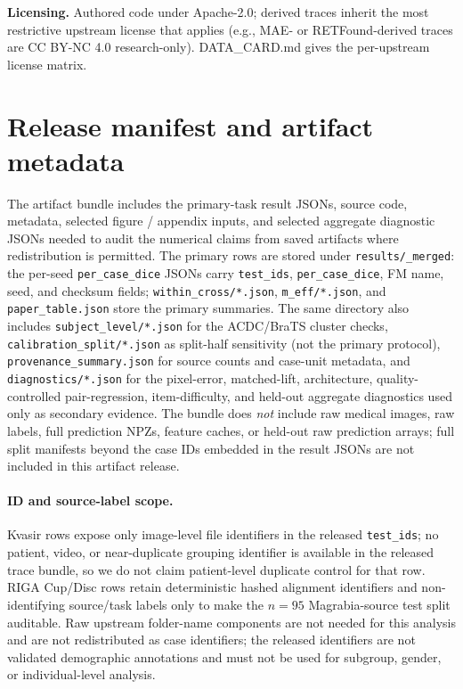 \textbf{Licensing.} Authored code under Apache-2.0; derived traces inherit the most restrictive upstream license that applies (e.g., MAE- or RETFound-derived traces are CC BY-NC 4.0 research-only). DATA\_CARD.md gives the per-upstream license matrix.

\section{Release manifest and artifact metadata}
\label{app:release-manifest}

The artifact bundle includes the primary-task result JSONs,
source code, metadata, selected figure / appendix inputs, and selected
aggregate diagnostic JSONs needed to audit the numerical claims from saved
artifacts where redistribution is permitted. The primary rows are stored under
\texttt{results/\_merged}: the per-seed \texttt{per\_case\_dice} JSONs carry
\texttt{test\_ids}, \texttt{per\_case\_dice}, FM name, seed, and checksum
fields; \texttt{within\_cross/*.json}, \texttt{m\_eff/*.json}, and
\texttt{paper\_table.json} store the primary summaries. The same
directory also includes \texttt{subject\_level/*.json} for the ACDC/BraTS
cluster checks, \texttt{calibration\_split/*.json} as split-half sensitivity
(not the primary protocol), \texttt{provenance\_summary.json} for source counts
and case-unit metadata, and \texttt{diagnostics/*.json} for the pixel-error,
matched-lift, architecture, quality-controlled pair-regression, item-difficulty, and held-out aggregate diagnostics
used only as secondary evidence. The bundle does \emph{not} include raw
medical images, raw labels, full prediction NPZs, feature caches, or held-out
raw prediction arrays; full split manifests beyond the case IDs embedded in the
result JSONs are not included in this artifact release.

\paragraph{ID and source-label scope.}
Kvasir rows expose only image-level file identifiers in the released
\texttt{test\_ids}; no patient, video, or near-duplicate grouping identifier is
available in the released trace bundle, so we do not claim patient-level
duplicate control for that row. RIGA Cup/Disc rows retain deterministic hashed
alignment identifiers and non-identifying source/task labels only to make the
$n{=}95$ Magrabia-source test split auditable. Raw upstream folder-name
components are not needed for this analysis and are not redistributed as case
identifiers; the released identifiers are not validated demographic annotations
and must not be used for subgroup, gender, or individual-level analysis.

